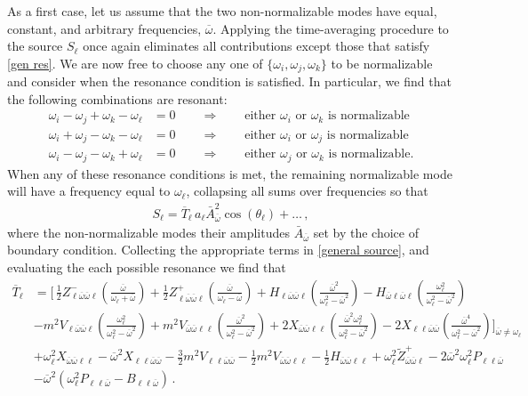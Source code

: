 \documentclass[letterpaper,11pt]{article}
\newcommand{\oi}{\omega_i}
\newcommand{\oj}{\omega_j}
\newcommand{\ok}{\omega_k}
\newcommand{\ol}{\omega_\ell}
\newcommand{\thl}{\theta_\ell}
\newcommand{\ob}{\overline{\omega}}
\begin{document}
As a first case, let us assume that the two non-normalizable modes have equal, constant, and arbitrary frequencies, $\ob$. Applying the time-averaging procedure to the source $S_\ell$ once again eliminates all contributions except those that satisfy \eqref{gen res}. We are now free to choose any one of $\{\omega_i, \omega_j, \ok\}$ to be normalizable and consider when the resonance condition is satisfied. In particular, we find that the following combinations are resonant:
\begin{align}
\label{gen nn res 1}
\oi - \oj + \ok - \ol &= 0 \qquad \Rightarrow \qquad \text{either $\oi$ or $\ok$ is normalizable} \\
\oi + \oj - \ok - \ol &= 0 \qquad \Rightarrow \qquad \text{either $\oi$ or $\oj$ is normalizable} \\
\oi - \oj - \ok + \ol &= 0 \qquad \Rightarrow \qquad \text{either $\oj$ or $\ok$ is normalizable.}
\label{gen nn res 2}
\end{align}
When any of these resonance conditions is met, the remaining normalizable mode will have a frequency equal to $\ol$, collapsing all sums over frequencies so that
\begin{align}
\label{2genNN}
S_\ell = \overline{T}_{\ell} \, a_\ell \bar A_{\ob}^2 \cos (\thl) + \ldots \, ,
\end{align}
where the non-normalizable modes their amplitudes $\bar A_{\ob}$ set by the choice of boundary condition. Collecting the appropriate terms in \eqref{general source}, and evaluating the each possible resonance we find that
\begin{align}
\label{S:2NN}
\overline{T}_{\ell} &=  \bigg[ \, \frac{1}{2} Z^-_{\ell\ob\ob\ell} \left( \frac{\ob}{\ol + \ob} \right) + \frac{1}{2} Z^+_{\ell\ob\ob\ell} \left( \frac{\ob}{\ol - \ob} \right)  + H_{\ell \ob \ob \ell} \left( \frac{\ob^2}{\ol^2 - \ob^2} \right)  - H_{\ob\ell\ob\ell} \left(\frac{\ol^2}{\ol^2 - \ob^2} \right) \nonumber \\
%
& - m^2 V_{\ell \ob\ob\ell}  \left(\frac{\ol^2}{\ol^2 - \ob^2} \right) + m^2 V_{\ob\ob\ell\ell} \left( \frac{\ob^2}{\ol^2 - \ob^2} \right) + 2 X_{\ob\ob\ell\ell} \left( \frac{\ob^2 \ol^2}{\ol^2 - \ob^2} \right) - 2 X_{\ell\ell\ob\ob} \left( \frac{\ob^4}{\ol^2 - \ob^2} \right) \bigg]_{\ob \neq \ol} \nonumber \\
%
&  + \ol^2 X_{\ob\ob\ell\ell}  - \ob^2 X_{\ell\ell\ob\ob} - \frac{3}{2} m^2 V_{\ell\ell\ob\ob} - \frac{1}{2} m^2 V_{\ob\ob\ell\ell}  - \frac{1}{2} H_{\ob\ob\ell\ell} + \ol^2 \tilde{Z}^+_{\ob\ob\ell} - 2 \ob^2 \ol^2 P_{\ell\ell\ob} \nonumber \\
%
& - \ob^2 \left( \ol^2 P_{\ell\ell \ob} - B_{\ell\ell\ob} \right) \, .
\end{align}
\end{document}
